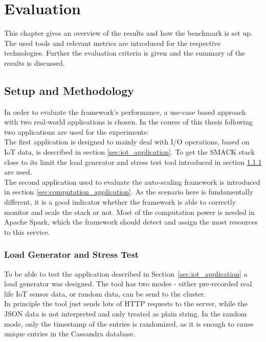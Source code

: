 \chapter{Evaluation}
\label{ch:evaluation}
This chapter gives an overview of the results and how the benchmark is set up.
The used tools and relevant metrics are introduced for the respective technologies.
Further the evaluation criteria is given and the summary of the results is discussed.

\section{Setup and Methodology}
\label{sec:evaluation_setup}
In order to evaluate the framework's performance, a use-case based approach with two real-world applications is chosen.
In the course of this thesis following two applications are used for the experiments:\\
The first application is designed to mainly deal with I/O operations, based on IoT data, is described in section \ref{sec:iot_application}.
To get the SMACK stack close to its limit the load generator and stress test tool introduced in section \ref{sec:load_generator} are used.\\
The second application used to evaluate the auto-scaling framework is introduced in section \ref{sec:computation_application}.
As the scenario here is fundamentally different, it is a good indicator whether the framework is able to correctly monitor and scale the stack or not.
Most of the computation power is needed in Apache Spark, which the framework should detect and assign the most resources to this service.\\


\subsection{Load Generator and Stress Test}
\label{sec:load_generator}
To be able to test the application described in Section~\ref{sec:iot_application} a load generator was designed.
The tool has two modes - either pre-recorded real life IoT sensor data, or random data, can be send to the cluster.\\
In principle the tool just sends lots of HTTP requests to the server, while the JSON data is not interpreted and only treated as plain string.
In the random mode, only the timestamp of the entries is randomized, as it is enough to cause unique entries in the Cassandra database.\\

